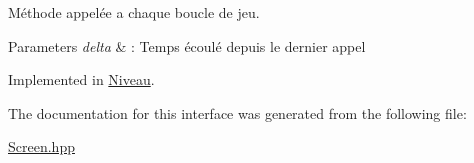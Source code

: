Méthode appelée a chaque boucle de jeu. 


\begin{DoxyParams}{Parameters}
{\em delta} & \+: Temps écoulé depuis le dernier appel \\
\hline
\end{DoxyParams}


Implemented in \hyperlink{class_niveau_a287b7fc08a2d7102008c134a72462d4f}{Niveau}.



The documentation for this interface was generated from the following file\+:\begin{DoxyCompactItemize}
\item 
\hyperlink{_screen_8hpp}{Screen.\+hpp}\end{DoxyCompactItemize}
